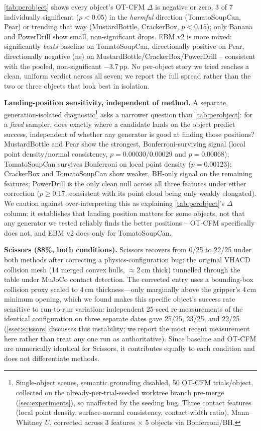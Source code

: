\documentclass[journal]{IEEEtran}
\begin{document}
\cref{tab:perobject} shows every object's OT-CFM $\Delta$ is negative or
zero, 3 of 7 individually significant ($p{<}0.05$) in the \emph{harmful}
direction (TomatoSoupCan, Pear) or trending that way (MustardBottle,
CrackerBox, $p{<}0.15$); only Banana and PowerDrill show small,
non-significant drops. EBM v2 is more mixed: significantly \emph{beats}
baseline on TomatoSoupCan, directionally positive on Pear, directionally
negative (ns) on MustardBottle/CrackerBox/PowerDrill -- consistent with the
pooled, non-significant $-3.7$\,pp. No per-object story we tried reaches a
clean, uniform verdict across all seven; we report the full spread rather
than the two or three objects that look best in isolation.

\noindent\textbf{Landing-position sensitivity, independent of method.}
A separate, generation-isolated diagnostic\footnote{Single-object scenes,
semantic grounding disabled, 50 OT-CFM trials/object, collected on the
already-per-trial-seeded worktree branch pre-merge (\cref{sec:experiments}),
so unaffected by the seeding bug. Three contact features (local point
density, surface-normal consistency, contact-width ratio), Mann--Whitney
$U$, corrected across 3 features $\times$ 5 objects via Bonferroni/BH.}
asks a narrower question than \cref{tab:perobject}: for a \emph{fixed}
sampler, does exactly where a candidate lands on the object predict
success, independent of whether any generator is good at finding those
positions? MustardBottle and Pear show the strongest, Bonferroni-surviving
signal (local point density/normal consistency, $p{=}0.00030$/$0.00029$ and
$p{=}0.00068$); TomatoSoupCan survives Bonferroni on local point density
($p{=}0.00123$); CrackerBox and TomatoSoupCan show weaker, BH-only signal on
the remaining features; PowerDrill is the only clean null across all three
features under either correction ($p{\geq}0.17$, consistent with its point
cloud being only weakly elongated). We caution against over-interpreting
this as explaining \cref{tab:perobject}'s $\Delta$ column: it establishes
that landing position matters for some objects, not that any generator we
tested reliably finds the better positions -- OT-CFM specifically does not,
and EBM v2 does only for TomatoSoupCan.

\noindent\textbf{Scissors (88\%, both conditions).}
Scissors recovers from 0/25 to 22/25 under both methods after correcting
a physics-configuration bug: the original VHACD collision mesh
(14 merged convex hulls, $\approx$2\,cm thick) tunnelled through
the table under MuJoCo contact detection.
The corrected entry uses a bounding-box collision proxy scaled to
4\,cm thickness---only marginally above the gripper's 4\,cm minimum
opening, which we found makes this specific object's success rate
sensitive to run-to-run variation: independent 25-seed re-measurements
of the identical configuration on three separate dates gave 25/25, 23/25,
and 22/25 (\cref{ssec:scissors} discusses this instability; we report the
most recent measurement here rather than treat any one run as
authoritative).
Since baseline and OT-CFM are numerically identical for Scissors, it
contributes equally to each condition and does not differentiate methods.
\end{document}
